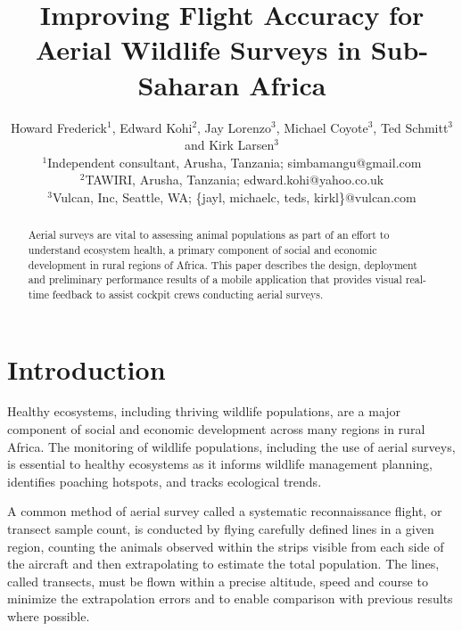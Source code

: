 \documentclass{sig-alternate-2013}
\begin{document}
\title{Improving Flight Accuracy for Aerial Wildlife Surveys in Sub-Saharan Africa}
\author{
Howard Frederick$^{1}$, Edward Kohi$^{2}$, Jay Lorenzo$^{3}$, Michael Coyote$^{3}$, Ted Schmitt$^{3}$ and Kirk Larsen$^{3}$\\	
\affaddr$^{1}$Independent consultant, Arusha, Tanzania; simbamangu@gmail.com \\
\affaddr$^{2}$TAWIRI, Arusha, Tanzania; edward.kohi@yahoo.co.uk  \\
\affaddr$^{3}$Vulcan, Inc, Seattle, WA; \{jayl, michaelc, teds, kirkl\}@vulcan.com
}
\maketitle

\begin{abstract}
Aerial surveys are vital to assessing animal populations as part of an effort to understand ecosystem health, a primary component of social and economic development in rural regions of Africa. This paper describes the design, deployment and preliminary performance results of a mobile application that provides visual real-time feedback to assist cockpit crews conducting aerial surveys.
\end{abstract}



\section{Introduction}
Healthy ecosystems, including thriving wildlife populations, are a major component of social and economic development across many regions in rural Africa. The monitoring of wildlife populations, including the use of aerial surveys, is essential to healthy ecosystems as it informs wildlife management planning, identifies poaching hotspots, and tracks ecological trends.

A common method of aerial survey called a systematic reconnaissance flight, or transect sample count, is conducted by flying carefully defined lines in a given region, counting the animals observed within the strips visible from each side of the aircraft and then extrapolating to estimate the total population.  The lines, called transects, must be flown within a precise altitude, speed and course to minimize the extrapolation errors and to enable comparison with previous results where possible.  
\end{document}
